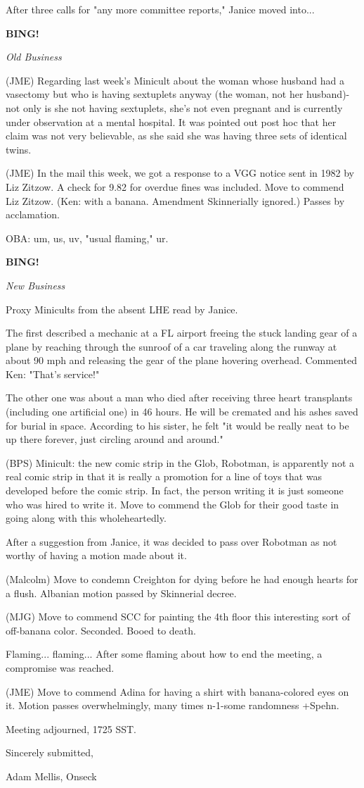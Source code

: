 \documentclass[12pt]{article}
\newcommand{\bing}{{\bf BING!} }
\newcommand{\goto}[1]{\bing \vskip 12pt \centerline{{\em{#1}}}}
\begin{document}
After three calls for "any more committee reports," Janice moved into...

\goto{Old Business}

(JME) Regarding last week's Minicult about the woman whose husband had a vasectomy but who is having sextuplets anyway (the woman, not her husband)- not only is she not having sextuplets, she's not even pregnant and is currently under observation at a mental hospital. It was pointed out post hoc that her claim was not very believable, as she said she was having three sets of identical twins.

(JME) In the mail this week, we got a response to a VGG notice sent in 1982 by Liz Zitzow. A check for 9.82 for overdue fines was included. Move to commend Liz Zitzow. (Ken: with a banana. Amendment Skinnerially ignored.) Passes by acclamation.

OBA: um, us, uv, "usual flaming," ur.

\goto{New Business}

Proxy Minicults from the absent LHE read by Janice.

The first described a mechanic at a FL airport freeing the stuck landing gear of a plane by reaching through the sunroof of a car traveling along the runway at about 90 mph and releasing the gear of the plane hovering overhead. Commented Ken: "That's service!"

The other one was about a man who died after receiving three heart transplants (including one artificial one) in 46 hours. He will be cremated and his ashes saved for burial in space. According to his sister, he felt "it would be really neat to be up there forever, just circling around and around."

(BPS) Minicult: the new comic strip in the Glob, Robotman, is apparently not a real comic strip in that it is really a promotion for a line of toys that was developed before the comic strip. In fact, the person writing it is just someone who was hired to write it. Move to commend the Glob for their good taste in going along with this wholeheartedly.

After a suggestion from Janice, it was decided to pass over Robotman as not worthy of having a motion made about it.

(Malcolm) Move to condemn Creighton for dying before he had enough hearts for a flush. Albanian motion passed by Skinnerial decree.

(MJG) Move to commend SCC for painting the 4th floor this interesting sort of off-banana color. Seconded. Booed to death.

Flaming... flaming... After some flaming about how to end the meeting, a compromise was reached.

(JME) Move to commend Adina for having a shirt with banana-colored eyes on it. Motion passes overwhelmingly, many times n-1-some randomness +Spehn.

\vspace{12pt}

\noindent
Meeting adjourned, 1725 SST.

\vspace{18pt}

\centerline{Sincerely submitted,}
\centerline{Adam Mellis, Onseck}
\end{document}
